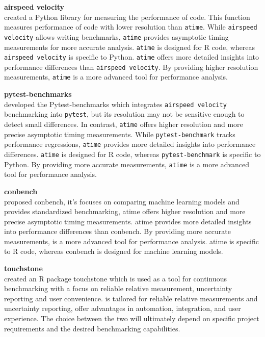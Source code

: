 \textbf{airspeed velocity} \\
\citet{airspeed_velocity} created a Python library for measuring the performance of code. This function measures performance of code with lower resolution than \texttt{atime}. While \texttt{airspeed velocity} allows writing benchmarks, \texttt{atime} provides asymptotic timing measurements for more accurate analysis. \texttt{atime} is designed for R code, whereas \texttt{airspeed velocity} is specific to Python. \texttt{atime} offers more detailed insights into performance differences than \texttt{airspeed velocity}. By providing higher resolution measurements, \texttt{atime} is a more advanced tool for performance analysis.
 
\vspace{0.1in}

\textbf{pytest-benchmarks} \\
\citet{pytest_benchmark} developed the Pytest-benchmarks which integrates \texttt{airspeed velocity} benchmarking into \texttt{pytest}, but its resolution may not be sensitive enough to detect small differences. In contrast, \texttt{atime} offers higher resolution and more precise asymptotic timing measurements. While \texttt{pytest-benchmark} tracks performance regressions, \texttt{atime} provides more detailed insights into performance differences. \texttt{atime} is designed for R code, whereas \texttt{pytest-benchmark} is specific to Python. By providing more accurate measurements, \texttt{atime} is a more advanced tool for performance analysis.
\vspace{0.1in}

\textbf{conbench} \\
\citet{conbench} proposed conbench, it's focuses on comparing machine learning models and provides standardized benchmarking, atime offers higher resolution and more precise asymptotic timing measurements. atime provides more detailed insights into performance differences than conbench. By providing more accurate measurements, is a more advanced tool for performance analysis. atime is specific to R code, whereas conbench is designed for machine learning models.
\vspace{0.1in}

\textbf{touchstone} \\

\citet{touchstone} created an R package touchstone which is used as a tool for continuous benchmarking with a focus on reliable relative measurement, uncertainty reporting and user convenience. \citet{touchstone} is tailored for reliable relative measurements and uncertainty reporting,  offer advantages in automation, integration, and user experience. The choice between the two will ultimately depend on specific project requirements and the desired benchmarking capabilities.

